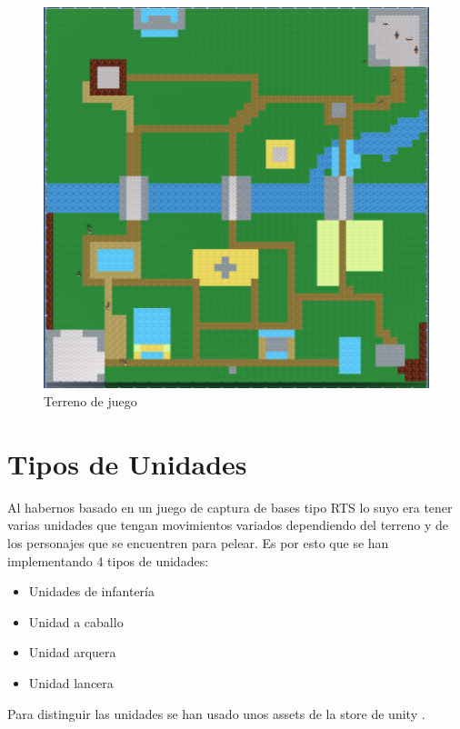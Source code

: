 \begin{figure}[H]
    \centering
    \includegraphics[scale=0.7]{images/Mapa.png}
    \caption{Terreno de juego}
    \label{fig:mapa}
\end{figure}

\section{Tipos de Unidades}

Al habernos basado en un juego de captura de bases tipo RTS lo suyo era tener varias unidades que tengan movimientos variados dependiendo del terreno y de los personajes que se encuentren para pelear. Es por esto que se han implementando 4 tipos de unidades:

\begin{multicols}{2}
    \begin{itemize}
        \item Unidades de infantería
        \item Unidad a caballo
        \item Unidad arquera
        \item Unidad lancera
    \end{itemize}
\end{multicols}

Para distinguir las unidades se han usado unos assets de la store de unity \cite{toonrts}.

